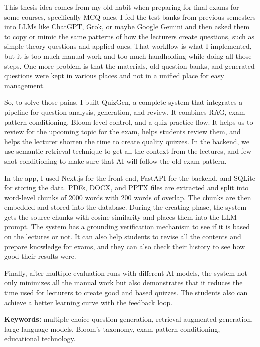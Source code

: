 \documentclass[12pt,a4paper]{article}
\begin{document}
\vspace{1cm}

This thesis idea comes from my old habit when preparing for final exams for
some courses, specifically MCQ ones. I fed the test banks from previous
semesters into LLMs like ChatGPT, Grok, or maybe Google Gemini and then
asked them to copy or mimic the same patterns of how the lecturers create
questions, such as simple theory questions and applied ones. That workflow
is what I implemented, but it is too much manual work and too much
handholding while doing all those steps. One more problem is that the
materials, old question banks, and generated questions were kept in various
places and not in a unified place for easy management.

So, to solve those pains, I built QuizGen, a complete system that integrates
a pipeline for question analysis, generation, and review. It combines RAG,
exam-pattern conditioning, Bloom-level control, and a quiz practice flow. It
helps us to review for the upcoming topic for the exam, helps students
review them, and helps the lecturer shorten the time to create quality
quizzes. In the backend, we use semantic retrieval technique to get all the
context from the lectures, and few-shot conditioning to make sure that AI
will follow the old exam pattern.

In the app, I used Next.js for the front-end, FastAPI for the backend, and
SQLite for storing the data. PDFs, DOCX, and PPTX files are extracted and
split into word-level chunks of 2000 words with 200 words of overlap. The
chunks are then embedded and stored into the database. During the creating
phase, the system gets the source chunks with cosine similarity and places
them into the LLM prompt. The system has a grounding verification mechanism
to see if it is based on the lectures or not. It can also help students to
revise all the contents and prepare knowledge for exams, and they can also
check their history to see how good their results were.

Finally, after multiple evaluation runs with different AI models, the system
not only minimizes all the manual work but also demonstrates that it reduces
the time used for lecturers to create good and based quizzes. The students
also can achieve a better learning curve with the feedback loop.

\bigskip
\noindent\textbf{Keywords:} multiple-choice question generation,
retrieval-augmented generation, large language models, Bloom's taxonomy,
exam-pattern conditioning, educational technology.
\end{document}
